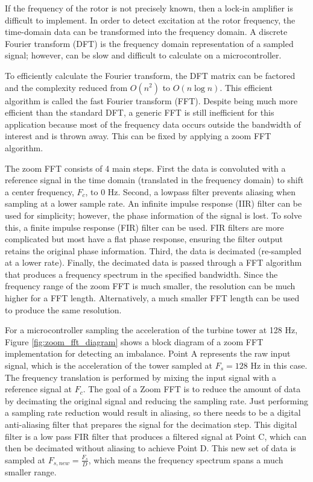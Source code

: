 If the frequency of the rotor is not precisely known, then a lock-in amplifier is difficult to implement.  In order to detect excitation at the rotor frequency, the time-domain data can be transformed into the frequency domain.  A discrete Fourier transform (DFT) is the frequency domain representation of a sampled signal; however, can be slow and difficult to calculate on a microcontroller.

To efficiently calculate the Fourier transform, the DFT matrix can be factored and the complexity reduced from $O(n^2)$ to $O(n \log{n})$.  This efficient algorithm is called the fast Fourier transform (FFT).  Despite being much more efficient than the standard DFT, a generic FFT is still inefficient for this application because most of the frequency data occurs outside the bandwidth of interest and is thrown away.  This can be fixed by applying a zoom FFT algorithm.

The zoom FFT consists of 4 main steps.  First the data is convoluted with a reference signal in the time domain (translated in the frequency domain) to shift a center frequency, $F_c$, to 0 Hz.  Second, a lowpass filter prevents aliasing when sampling at a lower sample rate.  An infinite impulse response (IIR) filter can be used for simplicity; however, the phase information of the signal is lost.  To solve this, a finite impulse response (FIR) filter can be used.  FIR filters are more complicated but most have a flat phase response, ensuring the filter output retains the original phase information.  Third, the data is decimated (re-sampled at a lower rate). Finally, the decimated data is passed through a FFT algorithm that produces a frequency spectrum in the specified bandwidth.  Since the frequency range of the zoom FFT is much smaller, the resolution can be much higher for a FFT length.  Alternatively, a much smaller FFT length can be used to produce the same resolution.

For a microcontroller sampling the acceleration of the turbine tower at 128 Hz, Figure \ref{fig:zoom_fft_diagram} shows a block diagram of a zoom FFT implementation for detecting an imbalance.  Point A represents the raw input signal, which is the acceleration of the tower sampled at $F_s=128$ Hz in this case.  The frequency translation is performed by mixing the input signal with a reference signal at $F_c$.  The goal of a Zoom FFT is to reduce the amount of data by decimating the original signal and reducing the sampling rate.  Just performing a sampling rate reduction would result in aliasing, so there needs to be a digital anti-aliasing filter that prepares the signal for the decimation step.  This digital filter is a low pass FIR filter that produces a filtered signal at Point C, which can then be decimated without aliasing to achieve Point D.  This new set of data is sampled at $F_{s,new}=\frac{F_s}{D}$, which means the frequency spectrum spans a much smaller range.


